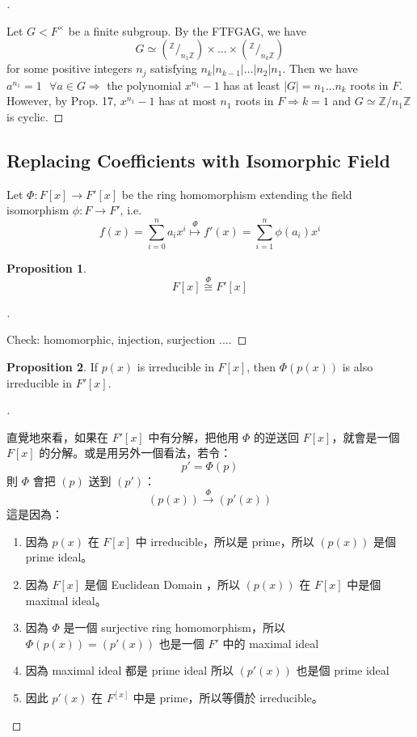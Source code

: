 \documentclass{article}
\newcommand{\sfa}{\text{  } \forall}
\theoremstyle{definition}
\newtheorem{prop}{Proposition}
\newenvironment{proofs}[1][\proofname]{%
  \begin{proof}[#1]$ $\par\nobreak\ignorespaces
}{%
  \end{proof}
}
\newcommand*\quot[2]{{^{\textstyle #1}\big/_{\textstyle #2}}}
\begin{document}
  \begin{proofs}
	Let $G < F^\times$ be a finite subgroup. By the FTFGAG, we have 
	\[
	  G \simeq (\quot{\mathbb{Z}}{n_1 \mathbb{Z}}) \times \hdots \times (\quot{\mathbb{Z}}{n_k\mathbb{Z}})
	\]
	for some positive integers $n_j$ satisfying $n_k |n_{k - 1}| \hdots |n_2| n_1$. Then we have $a^{n_1} = 1 \sfa a \in G \Rightarrow $ the polynomial $x^{n_1} - 1$ has at least $|G| = n_1 \hdots n_k$ roots in $F$. However, by Prop. 17, $x^{n_1} - 1$ has at most $n_1$ roots in $F \Rightarrow k = 1$ and $G \simeq \mathbb{Z}/n_1 \mathbb{Z}$ is cyclic.  
  \end{proofs}

\subsection{Replacing Coefficients with Isomorphic Field}
Let ${\Phi}:F[x]\to F'[x]$ be the ring homomorphism extending the field isomorphism $\phi:F\to F'$, i.e.
	\[f(x)=\sum_{i=0}^n a_i x^i \overset{{\Phi}}{\mapsto} f'(x)=\sum_{i=1}^n \phi(a_i) x^i\]
\begin{prop}
\[F[x]\overset{\Phi}{\cong} F'[x] \]
\end{prop}

\begin{proofs}
	Check: homomorphic, injection, surjection ....
\end{proofs}

\begin{prop}
If $p(x)$ is irreducible in $F[x]$, then $\Phi(p(x))$ is also irreducible in $F'[x]$.
\end{prop}

\begin{proofs}
	
直覺地來看，如果在 $F'[x]$ 中有分解，把他用 $\Phi$ 的逆送回 $F[x]$，就會是一個 $F[x]$ 的分解。或是用另外一個看法，若令：
$$
p' = \Phi(p)
$$
則 $\Phi$ 會把 $(p)$ 送到 $(p')$：
$$
(p(x)) \overset{\Phi}{\to}(p'(x))
$$
這是因為：
\begin{enumerate}
\item 因為 $p(x)$ 在 $F[x]$ 中 irreducible，所以是 prime，所以 $(p(x))$ 是個 prime ideal。
\item 因為 $F[x]$ 是個 Euclidean Domain ，所以 $(p(x))$ 在 $F[x]$ 中是個 maximal ideal。
\item 因為 $\Phi$ 是一個 surjective ring homomorphism，所以 $\Phi(p(x)) = (p'(x))$ 也是一個 $F'$ 中的 maximal ideal
\item 因為 maximal ideal 都是 prime ideal 所以 $(p'(x))$ 也是個 prime ideal
\item 因此 $p'(x)$ 在 $F^[x]$ 中是 prime，所以等價於 irreducible。
\end{enumerate}
\end{proofs}
\end{document}
